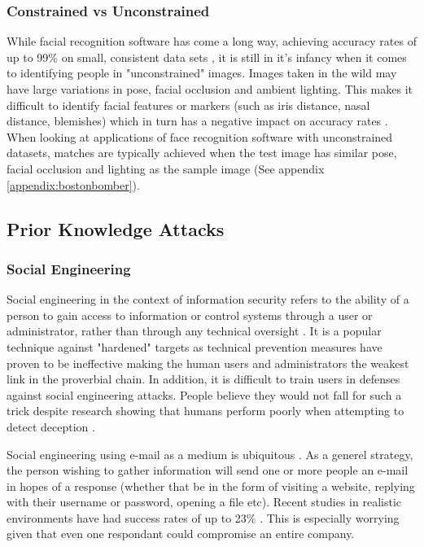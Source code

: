 \documentclass[12pt]{article}
\begin{document}
\subsubsection{Constrained vs Unconstrained}
While facial recognition software has come a long way, achieving accuracy rates of up to 99\% on small, consistent data sets \citep{facialrecogidentifyingpoi}, it is still in it's infancy when it comes to identifying people in "unconstrained" images. Images taken in the wild may have large variations in pose, facial occlusion and ambient lighting. This makes it difficult to identify facial features or markers (such as iris distance, nasal distance, blemishes) which in turn has a negative impact on accuracy rates \citep{unconstrainedfacialrecogbenchmark}. When looking at applications of face recognition software with unconstrained datasets, matches are typically achieved when the test image has similar pose, facial occlusion and lighting as the sample image (See appendix \ref{appendix:bostonbomber}).

\subsection{Prior Knowledge Attacks}
\subsubsection{Social Engineering}
Social engineering in the context of information security refers to the ability of a person to gain access to information or control systems through a user or administrator, rather than through any technical oversight \citep{socialengineeringvulnerabilites}. It is a popular technique against "hardened" targets as technical prevention measures have proven to be ineffective \citep{advancedsocialengineering} making the human users and administrators the weakest link in the proverbial chain. In addition, it is difficult to train users in defenses against social engineering attacks. People believe they would not fall for such a trick despite research showing that humans perform poorly when attempting to detect deception \citep{advancedsocialengineering}\citep{socialengineeringvulnerabilites}. 

Social engineering using e-mail as a medium is ubiquitous \citep{socialengineeringvulnerabilites}. As a generel strategy, the person wishing to gather information will send one or more people an e-mail in hopes of a response (whether that be in the form of visiting a website, replying with their username or password, opening a file etc). Recent studies in realistic environments have had success rates of up to 23\% \citep{socialengineeringvulnerabilites}. This is especially worrying given that even one respondant could compromise an entire company.
\end{document}
